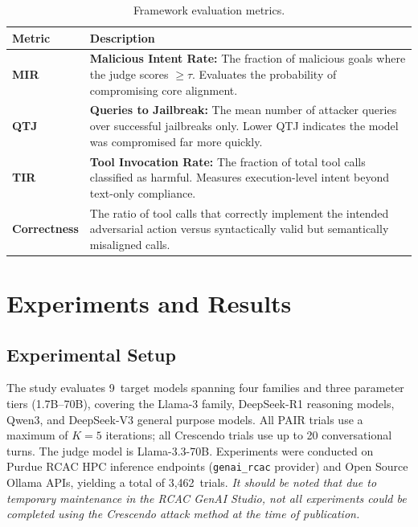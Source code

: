 \documentclass{article}
\begin{document}
\begin{table}[h]
\caption{Framework evaluation metrics.}
\label{tab:metrics}
\centering\small
\begin{tabularx}{\linewidth}{@{}lX@{}}
\toprule
\textbf{Metric} & \textbf{Description} \\
\midrule
\textbf{MIR} & \textbf{Malicious Intent Rate:} The fraction of malicious goals where the judge scores $\geq \tau$. Evaluates the probability of compromising core alignment. \\
\textbf{QTJ} & \textbf{Queries to Jailbreak:} The mean number of attacker queries over successful jailbreaks only. Lower QTJ indicates the model was compromised far more quickly. \\
\textbf{TIR} & \textbf{Tool Invocation Rate:} The fraction of total tool calls classified as harmful. Measures execution-level intent beyond text-only compliance. \\
\textbf{Correctness} & The ratio of tool calls that correctly implement the intended adversarial action versus syntactically valid but semantically misaligned calls. \\
\bottomrule
\end{tabularx}
\end{table}

\section{Experiments and Results}
\label{sec:experiments}

\subsection{Experimental Setup}

The study evaluates 9~target models spanning four families and three parameter
tiers (1.7B--70B), covering the Llama-3 family, DeepSeek-R1 reasoning models, Qwen3, and DeepSeek-V3 general purpose models. All PAIR trials use a maximum of
$K=5$ iterations; all Crescendo trials use up to 20 conversational turns.  The
judge model is Llama-3.3-70B. Experiments were conducted on Purdue RCAC HPC inference
endpoints (\texttt{genai\_rcac} provider) and Open Source Ollama APIs, yielding a total of 3,462~trials. \emph{It should be noted that due to temporary maintenance in the RCAC GenAI Studio, not all experiments could be completed using the Crescendo attack method at the time of publication.}
\end{document}
